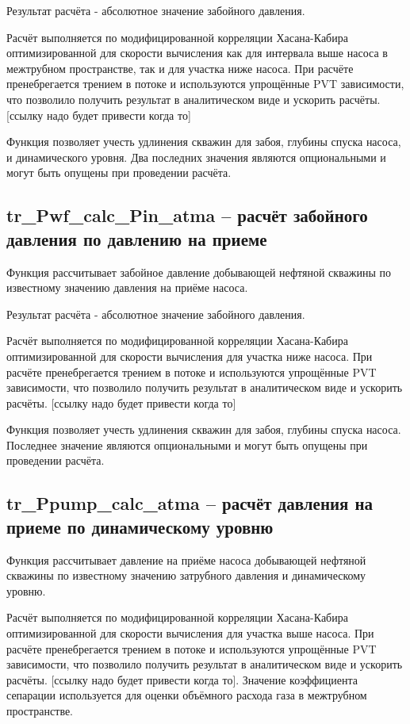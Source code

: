 \documentclass[]{scrreprt}
\begin{document}
Результат расчёта - абсолютное значение забойного давления. 

Расчёт выполняется по модифицированной корреляции Хасана-Кабира оптимизированной для скорости вычисления как для интервала выше насоса в межтрубном пространстве, так и для участка ниже насоса. При расчёте пренебрегается трением в потоке и используются упрощённые PVT зависимости, что позволило получить результат в аналитическом виде и ускорить расчёты. [ссылку надо будет привести когда то] 

Функция позволяет учесть удлинения скважин для забоя, глубины спуска насоса, и динамического уровня. Два последних значения являются опциональными и могут быть опущены при проведении расчёта. 




\subsection{tr\_Pwf\_calc\_Pin\_atma – расчёт забойного давления по давлению на приеме}
Функция рассчитывает забойное давление добывающей нефтяной скважины по известному значению давления на приёме насоса. 

Результат расчёта - абсолютное значение забойного давления. 

Расчёт выполняется по модифицированной корреляции Хасана-Кабира оптимизированной для скорости вычисления для участка ниже насоса. При расчёте пренебрегается трением в потоке и используются упрощённые PVT зависимости, что позволило получить результат в аналитическом виде и ускорить расчёты. [ссылку надо будет привести когда то] 

Функция позволяет учесть удлинения скважин для забоя, глубины спуска насоса. Последнее значение являются опциональными и могут быть опущены при проведении расчёта. 


\subsection{tr\_Ppump\_calc\_atma – расчёт давления на приеме по динамическому уровню}
Функция рассчитывает давление на приёме насоса добывающей нефтяной скважины по известному значению затрубного давления и динамическому уровню. 

Расчёт выполняется по модифицированной корреляции Хасана-Кабира оптимизированной для скорости вычисления для участка выше насоса. При расчёте пренебрегается трением в потоке и используются упрощённые PVT зависимости, что позволило получить результат в аналитическом виде и ускорить расчёты. [ссылку надо будет привести когда то]. Значение коэффициента сепарации используется для оценки объёмного расхода газа в межтрубном пространстве. 
\end{document}
